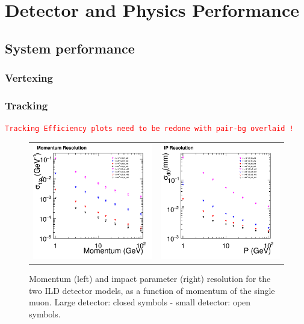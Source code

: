 \newcommand{\fix}[1]{\textcolor{red}{\texttt{#1}}} %

\chapter{Detector and Physics Performance}
\section{System performance}
\subsection{Vertexing}
\subsection{Tracking}

\fix{Tracking Efficiency plots need to be redone with pair-bg overlaid !}

%
% 
\begin{figure}[b!]
\begin{tabular}{cc}
\includegraphics[width=0.5\hsize]{Performance/fig/PResolution_ILD_ls5_v02.png} &
\includegraphics[width=0.5\hsize]{Performance/fig/IPResolution_ILD_ls5_v02.png}
\end{tabular}
\caption{\label{ild:fig:intro:tracking} Momentum (left) and impact parameter (right) resolution for the two ILD detector models,
  as a function of momentum of the single muon. Large detector: closed symbols - small detector: open symbols.}
\end{figure}


